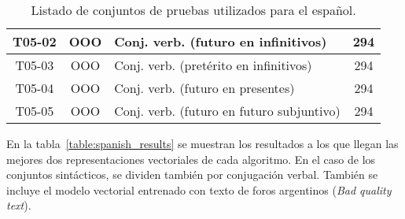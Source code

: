 \begin{table}[!h]
\begin{tabularx}{\textwidth}{ccYc}
        \midrule
        T05-02 & OOO & Conj. verb. (futuro en infinitivos) & 294\\
        \midrule
        T05-03 & OOO & Conj. verb. (pretérito en infinitivos) & 294\\
        \midrule
        T05-04 & OOO & Conj. verb. (futuro en presentes) & 294\\
        \midrule
        T05-05 & OOO & Conj. verb. (futuro en futuro subjuntivo) & 294\\
        \midrule
        \bottomrule
    \end{tabularx}
    \caption{Listado de conjuntos de pruebas utilizados para el español.}
    \label{table:testset_spanish}
\end{table}

En la tabla~\ref{table:spanish_results} se muestran los resultados a los que llegan las mejores dos
representaciones vectoriales de cada algoritmo. En el caso de los conjuntos sintácticos, se dividen
también por conjugación verbal. También se incluye el modelo vectorial entrenado con texto de foros
argentinos (\textit{Bad quality text}).

